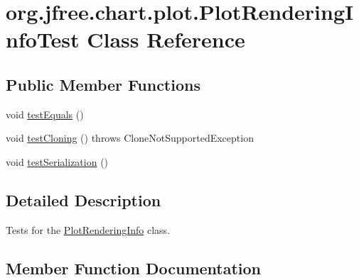 \hypertarget{classorg_1_1jfree_1_1chart_1_1plot_1_1_plot_rendering_info_test}{}\section{org.\+jfree.\+chart.\+plot.\+Plot\+Rendering\+Info\+Test Class Reference}
\label{classorg_1_1jfree_1_1chart_1_1plot_1_1_plot_rendering_info_test}
\subsection*{Public Member Functions}
\begin{DoxyCompactItemize}
\item 
void \mbox{\hyperlink{classorg_1_1jfree_1_1chart_1_1plot_1_1_plot_rendering_info_test_ae2cde28a10d4ae217251efcb7149a920}{test\+Equals}} ()
\item 
void \mbox{\hyperlink{classorg_1_1jfree_1_1chart_1_1plot_1_1_plot_rendering_info_test_ab12333819fa4b464f19afaea2b9a6cfc}{test\+Cloning}} ()  throws Clone\+Not\+Supported\+Exception 
\item 
void \mbox{\hyperlink{classorg_1_1jfree_1_1chart_1_1plot_1_1_plot_rendering_info_test_a3400783b2517b0297f135c046d66dd41}{test\+Serialization}} ()
\end{DoxyCompactItemize}


\subsection{Detailed Description}
Tests for the \mbox{\hyperlink{classorg_1_1jfree_1_1chart_1_1plot_1_1_plot_rendering_info}{Plot\+Rendering\+Info}} class. 

\subsection{Member Function Documentation}
\mbox{\label{classorg_1_1jfree_1_1chart_1_1plot_1_1_plot_rendering_info_test_ab12333819fa4b464f19afaea2b9a6cfc}} 
